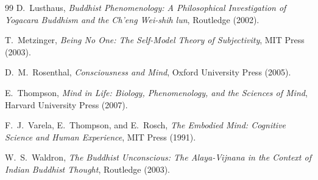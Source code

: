 \documentclass[12pt]{article}
\begin{document}
\begin{thebibliography}{99}
D.~Lusthaus,
\emph{Buddhist Phenomenology: A Philosophical Investigation of Yogacara Buddhism and the Ch'eng Wei-shih lun},
Routledge (2002).

T.~Metzinger,
\emph{Being No One: The Self-Model Theory of Subjectivity},
MIT Press (2003).

D.~M.~Rosenthal,
\emph{Consciousness and Mind},
Oxford University Press (2005).

E.~Thompson,
\emph{Mind in Life: Biology, Phenomenology, and the Sciences of Mind},
Harvard University Press (2007).

F.~J.~Varela, E.~Thompson, and E.~Rosch,
\emph{The Embodied Mind: Cognitive Science and Human Experience},
MIT Press (1991).

W.~S.~Waldron,
\emph{The Buddhist Unconscious: The Alaya-Vijnana in the Context of Indian Buddhist Thought},
Routledge (2003).

\end{thebibliography}
\end{document}

